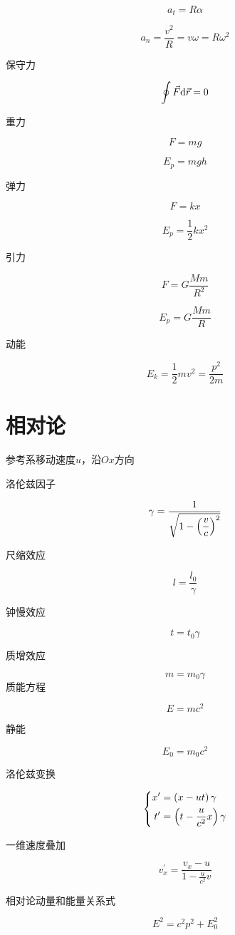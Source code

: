 \documentclass{article}
\begin{document}
\[a_t=R\alpha\]

\[a_n=\frac{v^2}R=v\omega=R\omega^2\]

保守力

\[\oint\vec F\mathrm d\vec r=0\]

重力

\[F=mg\]

\[E_p=mgh\]

弹力

\[F=kx\]

\[E_p=\frac12kx^2\]

引力

\[F=G\frac{Mm}{R^2}\]

\[E_p=G\frac{Mm}R\]

动能

\[E_k=\frac12mv^2=\frac{p^2}{2m}\]

\part{相对论}

参考系移动速度$u$，沿$Ox$方向

洛伦兹因子

\[\gamma=\frac1{\sqrt{1-\left(\displaystyle\frac vc\right)^2}}\]

尺缩效应

\[l=\frac{l_0}\gamma\]

钟慢效应

\[t=t_0\gamma\]

质增效应

\[m=m_0\gamma\]
质能方程

\[E=mc^2\]

静能

\[E_0=m_0c^2\]

洛伦兹变换

\[\left\{\begin{aligned}
        x^\prime & =\left(x-ut\right)\gamma            \\
        t^\prime & =\left(t-\frac u{c^2}x\right)\gamma
    \end{aligned}\right.\]

一维速度叠加

\[v_x^\prime=\frac{v_x-u}{1-\displaystyle\frac u{c^2}v}\]


相对论动量和能量关系式

\[E^2=c^2p^2+E_0^2\]
\end{document}
